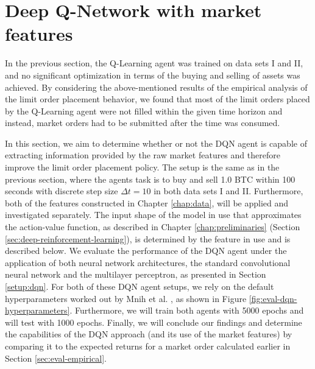 \section{Deep Q-Network with market features}
\label{sec:eval-dqn}
In the previous section, the Q-Learning agent was trained on data sets I and II, and no significant optimization in terms of the buying and selling of assets was achieved.
By considering the above-mentioned results of the empirical analysis of the limit order placement behavior, we found that most of the limit orders placed by the Q-Learning agent were not filled within the given time horizon and instead, market orders had to be submitted after the time was consumed.

In this section, we aim to determine whether or not the DQN agent is capable of extracting information provided by the raw market features and therefore improve the limit order placement policy.
The setup is the same as in the previous section, where the agents task is to buy and sell 1.0 BTC within 100 seconds with discrete step size $\Delta{t}=10$ in both data sets I and II.
Furthermore, both of the features constructed in Chapter \ref{chap:data}, will be applied and investigated separately.
The input shape of the model in use that approximates the action-value function, as described in Chapter \ref{chap:preliminaries} (Section \ref{sec:deep-reinforcement-learning}), is determined by the feature in use and is described below.
We evaluate the performance of the DQN agent under the application of both neural network architectures, the standard convolutional neural network and the multilayer perceptron, as presented in Section \ref{setup:dqn}.
For both of these DQN agent setups, we rely on the default hyperparameters worked out by Mnih et al. \cite{mnih2015human}, as shown in Figure \ref{fig:eval-dqn-hyperparameters}.
Furthermore, we will train both agents with 5000 epochs and will test with 1000 epochs.
Finally, we will conclude our findings and determine the capabilities of the DQN approach (and its use of the market features) by comparing it to the expected returns for a market order calculated earlier in Section \ref{sec:eval-empirical}.

